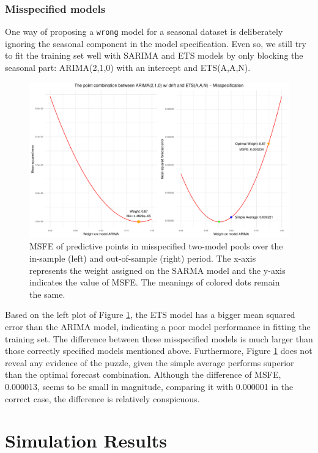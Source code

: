 \documentclass{monashthesis}
\begin{document}
\hypertarget{misspecified-models}{%
\subsection{Misspecified models}\label{misspecified-models}}

One way of proposing a \texttt{wrong} model for a seasonal dataset is deliberately ignoring the seasonal component in the model specification. Even so, we still try to fit the training set well with SARIMA and ETS models by only blocking the seasonal part: ARIMA(2,1,0) with an intercept and ETS(A,A,N).

\begin{figure}[ht]
\centering
\includegraphics[scale=0.6]{figures/EMPL_misspecified.pdf}
\caption{MSFE of predictive points in misspecified two-model pools over the in-sample (left) and out-of-sample (right) period. The x-axis represents the weight assigned on the SARMA model and the y-axis indicates the value of MSFE. The meanings of colored dots remain the same.}
\label{fig:sdm}
\end{figure}

Based on the left plot of Figure \ref{fig:sdm}, the ETS model has a bigger mean squared error than the ARIMA model, indicating a poor model performance in fitting the training set. The difference between these misspecified models is much larger than those correctly specified models mentioned above. Furthermore, Figure \ref{fig:sdm} does not reveal any evidence of the puzzle, given the simple average performs superior than the optimal forecast combination. Although the difference of MSFE, 0.000013, seems to be small in magnitude, comparing it with 0.000001 in the correct case, the difference is relatively conspicuous.

\hypertarget{simulation-results}{%
\chapter{Simulation Results}\label{simulation-results}}
\end{document}
